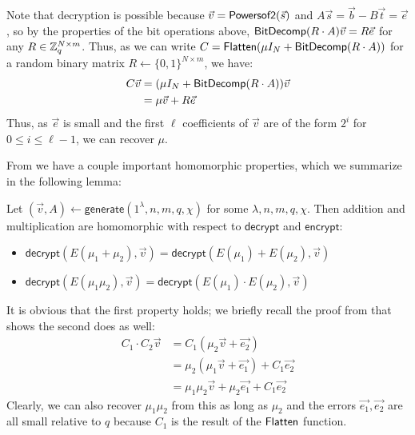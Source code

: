 Note that decryption is possible because $\vec{v} = \mathsf{Powersof2}(\vec{s})$ and $A\vec{s} = \vec{b} - B\vec{t} = \vec{e}$, so by the properties of the bit operations above, $\mathsf{BitDecomp}(R\cdot A)\vec{v} = R\vec{e}$ for any $R \in \mathbb{Z}_q^{N \times m}$.  Thus, as we can write $C = \mathsf{Flatten}(\mu I_N + \mathsf{BitDecomp}(R\cdot A))$ for a random binary matrix $R \leftarrow \{0,1\}^{N\times m}$, we have:
\begin{align*}
C\vec{v} &= (\mu I_N + \mathsf{BitDecomp}(R\cdot A))\vec{v}\\
&= \mu \vec{v} + R\vec{e}
\end{align*}
Thus, as $\vec{e}$ is small and the first $\ell$ coefficients of $\vec{v}$ are of the form $2^i$ for $0 \leq i \leq \ell-1$, we can recover $\mu$.

From \cite{gsw} we have a couple important homomorphic properties, which we summarize in the following lemma:

\begin{lemma}
\label{gswprop}
Let $(\vec{v}, A) \leftarrow \mathsf{generate}(1^\lambda, n, m, q, \chi)$ for some $\lambda, n, m, q, \chi$.  Then addition and multiplication are homomorphic with respect to $\mathsf{decrypt}$ and $\mathsf{encrypt}$:
\begin{itemize}
\item $\mathsf{decrypt}(E(\mu_1 + \mu_2), \vec{v}) = \mathsf{decrypt}(E(\mu_1) + E(\mu_2), \vec{v})$
\item $\mathsf{decrypt}(E(\mu_1\mu_2), \vec{v}) = \mathsf{decrypt}(E(\mu_1)\cdot E(\mu_2), \vec{v})$
\end{itemize}
\end{lemma}

It is obvious that the first property holds; we briefly recall the proof from \cite{gsw} that shows the second does as well:
\begin{align*}
C_1\cdot C_2\vec{v} &= C_1(\mu_2\vec{v} + \vec{e_2})\\
&= \mu_2(\mu_1\vec{v} + \vec{e_1}) + C_1\vec{e_2}\\
&= \mu_1\mu_2\vec{v} + \mu_2\vec{e_1} + C_1\vec{e_2}
\end{align*}
Clearly, we can also recover $\mu_1\mu_2$ from this as long as $\mu_2$ and the errors $\vec{e_1}, \vec{e_2}$ are all small relative to $q$ because $C_1$ is the result of the $\mathsf{Flatten}$ function.
